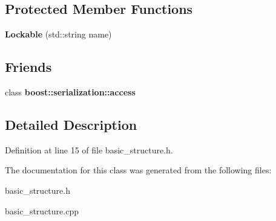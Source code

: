 \subsection*{Protected Member Functions}
\begin{DoxyCompactItemize}
\item 
\hypertarget{class_lockable_a77a726b41027e421f0735f546d667417}{}\label{class_lockable_a77a726b41027e421f0735f546d667417} 
{\bfseries Lockable} (std\+::string name)
\end{DoxyCompactItemize}
\subsection*{Friends}
\begin{DoxyCompactItemize}
\item 
\hypertarget{class_lockable_ac98d07dd8f7b70e16ccb9a01abf56b9c}{}\label{class_lockable_ac98d07dd8f7b70e16ccb9a01abf56b9c} 
class {\bfseries boost\+::serialization\+::access}
\end{DoxyCompactItemize}


\subsection{Detailed Description}


Definition at line 15 of file basic\+\_\+structure.\+h.



The documentation for this class was generated from the following files\+:\begin{DoxyCompactItemize}
\item 
basic\+\_\+structure.\+h\item 
basic\+\_\+structure.\+cpp\end{DoxyCompactItemize}
